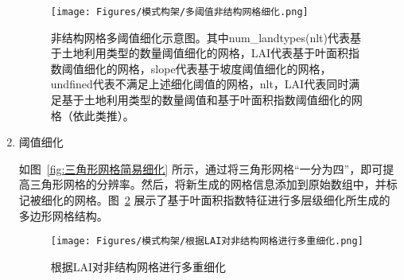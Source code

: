 \begin{enumerate}[label=\alph*)]
    {
      \begin{figure}[htbp]
        \centering
        \texttt{[image: Figures/模式构架/多阈值非结构网格细化.png]}
        \caption{非结构网格多阈值细化示意图。其中num\_landtypes(nlt)代表基于土地利用类型的数量阈值细化的网格，LAI代表基于叶面积指数阈值细化的网格，slope代表基于坡度阈值细化的网格，undfined代表不满足上述细化阈值的网格，nlt，LAI代表同时满足基于土地利用类型的数量阈值和基于叶面积指数阈值细化的网格（依此类推）。}
        \label{fig:多阈值非结构网格细化}
      \end{figure}
    }

  \item 阈值细化

   如图~\ref{fig:三角形网格简易细化} 所示，通过将三角形网格“一分为四”，即可提高三角形网格的分辨率。然后，将新生成的网格信息添加到原始数组中，并标记被细化的网格。图~\ref{fig:根据LAI对非结构网格进行多重细化} 展示了基于叶面积指数特征进行多层级细化所生成的多边形网格结构。

    {
      \begin{figure}[htbp]
        \centering
        \texttt{[image: Figures/模式构架/根据LAI对非结构网格进行多重细化.png]}
        \caption{根据LAI对非结构网格进行多重细化}
        \label{fig:根据LAI对非结构网格进行多重细化}
      \end{figure}
    }


\end{enumerate}
